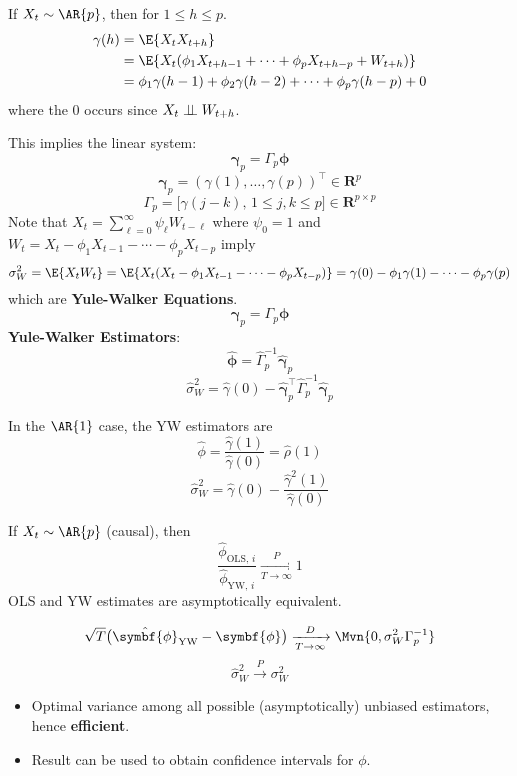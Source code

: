 If $ X_t \sim \AR{p} $, then for $ 1\le h\le p $.
\begin{align*}
    \gamma(h)
     & =\E{X_{t}X_{t+h}}                                               \\
     & =\E{X_t(\phi_1 X_{t+h-1}+\cdots+\phi_p X_{t+h-p}+W_{t+h})}      \\
     & =\phi_1\gamma(h-1)+\phi_2\gamma(h-2)+\cdots+\phi_p\gamma(h-p)+0
\end{align*}
where the $ 0 $ occurs since $ X_t\perp\!\!\!\perp W_{t+h} $.

This implies the linear system:
\[ \symbf{\gamma}_p=\Gamma_p \symbf{\phi} \]
\[ \symbf{ \gamma}_p=(\gamma(1),\ldots,\gamma(p))^\top \in\mathbf{R}^p \]
\[  \Gamma_p=\bigl[\gamma(j-k),\, 1\le j,k\le p\bigr]\in\mathbf{R}^{p\times p} \]
Note that $ X_t=\sum_{\ell=0}^{\infty} \psi_\ell W_{t-\ell} $ where $ \psi_0=1 $
and $ W_t=X_t-\phi_1X_{t-1}-\cdots-\phi_p X_{t-p} $ imply
\[ \sigma_W^2=\E{X_t W_t}
    =\E{X_t(X_t-\phi_1 X_{t-1}-\cdots-\phi_p X_{t-p})}
    =\gamma(0)-\phi_1\gamma(1)-\cdots-\phi_p\gamma(p) \]
which are \textbf{Yule-Walker Equations}.
\[ \symbf{\gamma}_p=\Gamma_p \symbf{\phi} \]
\textbf{Yule-Walker Estimators}:
\[ \hat{\symbf{\phi}}=\hat{\Gamma}_p^{-1} \symbf{\hat{\gamma}}_p \]
\[ \hat{\sigma}_W^2=\hat{\gamma}(0)-\hat{\symbf{\gamma}}_p^\top \hat{\Gamma}_p^{-1}\hat{\symbf{\gamma}}_p \]
\begin{Example}{}{}
    In the $ \AR{1} $ case, the YW estimators are
    \[ \hat{\phi}=\frac{\hat{\gamma}(1)}{\hat{\gamma}(0)}=\hat{\rho}(1)  \]
    \[ \hat{\sigma}_W^2=\hat{\gamma}(0)-\frac{\hat{\gamma}^2(1)}{\hat{\gamma}(0)}  \]
\end{Example}
\begin{Theorem}{}{}
    If $ X_t \sim \AR{p} $ (causal), then
    \[ \frac{\hat{\phi}_{\text{OLS, $i$}}}{\hat{\phi}_{\text{YW, $i$}}}
        \xrightarrow[T\to\infty]{P}1  \]
    OLS and YW estimates are asymptotically equivalent.
\end{Theorem}
\begin{Theorem}{}{}
    \[ \sqrt{T}\bigl(\hat{\symbf{\phi}}_{\text{YW}}-\symbf{\phi}\bigr)
        \xrightarrow[T\to\infty]{D}\Mvn{0,\sigma_W^2\Gamma_p^{-1}} \]
    \[ \hat{\sigma}_W^2\xrightarrow{P}\sigma_W^2 \]
    \begin{itemize}
        \item Optimal variance among all possible (asymptotically) unbiased estimators, hence \textbf{efficient}.
        \item Result can be used to obtain confidence intervals for $ \phi $.
    \end{itemize}
\end{Theorem}

